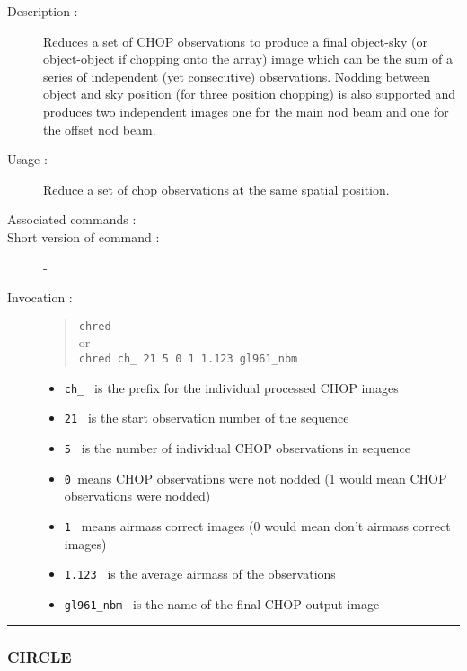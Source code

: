 \begin{description}

\item[Description :] Reduces a set of CHOP observations to produce a
final object-sky (or object-object if chopping onto the array) image
which can be the sum of a series of independent (yet consecutive)
observations. Nodding between object and sky position (for three
position chopping) is also supported and produces two independent
images one for the main nod beam and one for the offset nod beam.

\item[Usage :] Reduce a set of chop observations at the same spatial position.
\item[Associated commands :] {\tt {}}
\item[Short version of command :] -
\item[Invocation :]

\begin{quote}{\tt  chred }\\
or \\
{\tt chred ch\_ 21 5 0 1 1.123 gl961\_nbm }
\end{quote}

\begin{itemize}

\item {\tt ch\_ } is the prefix for the individual processed CHOP images
\item {\tt 21 } is the start observation number of the sequence
\item {\tt 5 } is the number of individual CHOP observations in sequence
\item {\tt 0 }means CHOP observations were not nodded
(1 would mean CHOP observations were  nodded)
\item {\tt 1 } means airmass correct images
(0 would mean don't airmass correct images)
\item {\tt 1.123 } is the average airmass of the observations
\item {\tt gl961\_nbm } is the name of the final CHOP output image
\end{itemize}

\end{description}

\hrule
\subsubsection*{\label{CIRCLE}CIRCLE}

